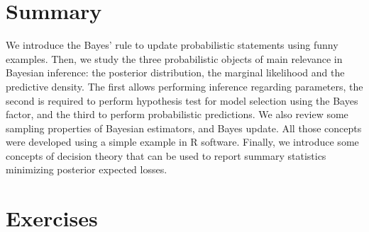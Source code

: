 \section{Summary}
We introduce the Bayes' rule to update probabilistic statements using funny examples. Then, we study  the three probabilistic objects of main relevance in Bayesian inference: the posterior distribution, the marginal likelihood and the predictive density. The first allows performing inference regarding parameters, the second is required to perform hypothesis test for model selection using the Bayes factor, and the third to perform probabilistic predictions. We also review some sampling properties of Bayesian estimators, and Bayes update. All those concepts were developed using a simple example in R software. Finally, we introduce some concepts of decision theory that can be used to report summary statistics minimizing posterior expected losses.
 
\section{Exercises}


